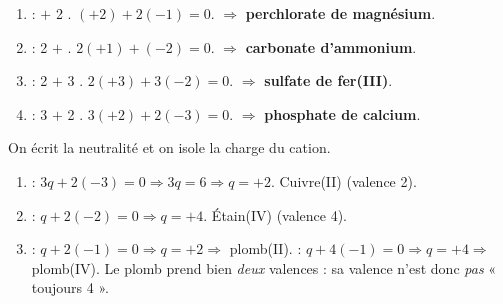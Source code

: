 \documentclass[11pt,a4paper]{article}
\begin{document}
\begin{corrige}
\begin{enumerate}[label=\alph*),leftmargin=1.8em,topsep=2pt,itemsep=1.5pt]
  \item {} :  $+$ 2 . $(+2)+2(-1)=0$. \checkmark $\Rightarrow$
        \textbf{perchlorate de magnésium}.
  \item {} : 2  $+$ . $2(+1)+(-2)=0$. \checkmark $\Rightarrow$
        \textbf{carbonate d'ammonium}.
  \item {} : 2  $+$ 3 . $2(+3)+3(-2)=0$. \checkmark $\Rightarrow$
        \textbf{sulfate de fer(III)}.
  \item {} : 3  $+$ 2 . $3(+2)+2(-3)=0$. \checkmark $\Rightarrow$
        \textbf{phosphate de calcium}.
\end{enumerate}
\end{corrige}

\begin{corrige}
On écrit la neutralité et on isole la charge du cation.
\begin{enumerate}[label=\alph*),leftmargin=1.8em,topsep=2pt,itemsep=1.5pt]
  \item {} : $3q + 2(-3)=0 \Rightarrow 3q = 6 \Rightarrow q=+2$. Cuivre(II) (valence 2).
  \item {} : $q + 2(-2)=0 \Rightarrow q=+4$. Étain(IV) (valence 4).
  \item {} : $q+2(-1)=0 \Rightarrow q=+2 \Rightarrow$ plomb(II). \quad
         : $q+4(-1)=0 \Rightarrow q=+4 \Rightarrow$ plomb(IV). Le plomb prend bien
        \emph{deux} valences : sa valence n'est donc \emph{pas} « toujours 4 ».
\end{enumerate}
\end{corrige}
\end{document}
